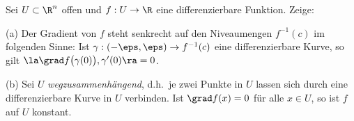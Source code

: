 \begin{prob} 
Sei $U\subset\R^n$ offen und $f:U\to\R$ eine differenzierbare
Funktion. Zeige:

(a) Der Gradient von $f$ steht senkrecht auf den Niveaumengen
$f^{-1}(c)$ im folgenden Sinne: Ist $\gamma:(-\eps,\eps)\to f^{-1}(c)$
eine differenzierbare Kurve, so gilt $\la \grad
f\bigl(\gamma(0)\bigr),\gamma'(0)\ra=0$.

(b) Sei $U$ {\it wegzusammenh\"angend}, d.h.~je zwei Punkte in $U$
lassen sich durch eine differenzierbare Kurve in $U$ verbinden. Ist $\grad
f(x)=0$ f\"ur alle $x\in U$, so ist $f$ auf $U$ konstant.
\end{prob}
